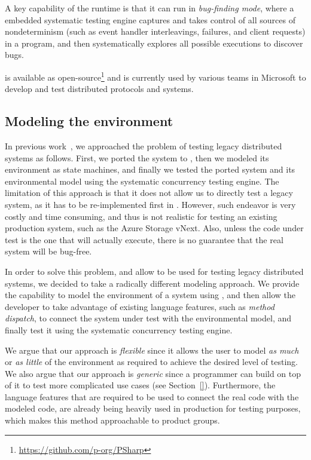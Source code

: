 A key capability of the \psharp runtime is that it can run in \emph{bug-finding mode}, where a embedded systematic testing engine captures and takes control of all sources of nondeterminism (such as event handler interleavings, failures, and client requests) in a \psharp program, and then systematically explores all possible executions to discover bugs.

\psharp is available as open-source\footnote{\url{https://github.com/p-org/PSharp}} and is currently used by various teams in Microsoft to develop and test distributed protocols and systems.


\subsection{Modeling the environment}
\label{sec:method:model}

In previous work~\cite{deligiannis2015psharp}, we approached the problem of testing legacy distributed systems as follows. First, we ported the system to \psharp, then we modeled its environment as \psharp state machines, and finally we tested the ported system and its environmental model using the \psharp systematic concurrency testing engine. The limitation of this approach is that it does not allow us to directly test a legacy system, as it has to be re-implemented first in \psharp. However, such endeavor is very costly and time consuming, and thus is not realistic for testing an existing production system, such as the Azure Storage vNext. Also, unless the code under test is the one that will actually execute, there is no guarantee that the real system will be bug-free.

In order to solve this problem, and allow \psharp to be used for testing legacy distributed systems, we decided to take a radically different modeling approach. We provide the capability to model the environment of a system using \psharp, and then allow the developer to take advantage of existing language features, such as \emph{method dispatch}, to connect the system under test with the environmental model, and finally test it using the \psharp systematic concurrency testing engine.

We argue that our approach is \emph{flexible} since it allows the user to model \emph{as much} or \emph{as little} of the environment as required to achieve the desired level of testing. We also argue that our approach is \emph{generic} since a programmer can build on top of it to test more complicated use cases (see Section~\ref{}). Furthermore, the language features that are required to be used to connect the real code with the modeled code, are already being heavily used in production for testing purposes, which makes this method approachable to product groups.

